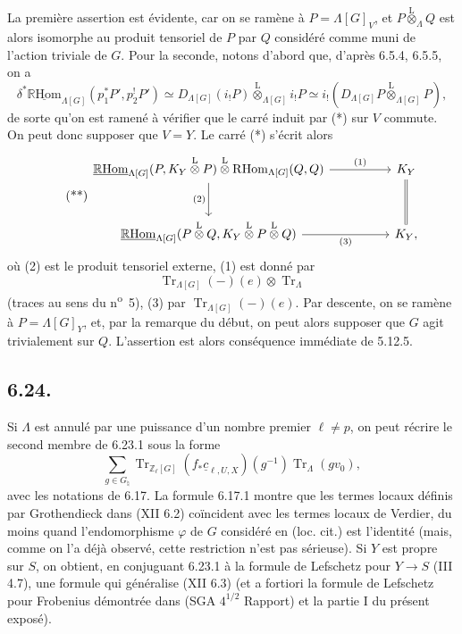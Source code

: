\documentclass[11pt]{article}
\newcommand{\R}{\mathbb{R}}\newcommand{\RHomCore}{\mathbb{R}\mathrm{Hom}}
\providecommand{\RHom}{\RHomCore}
\providecommand{\uRHom}{\underline{\RHom}}
\providecommand{\Tr}{\operatorname{Tr}}
\providecommand{\Tr}{\operatorname{Tr}}
\providecommand{\lten}{\overset{\mathrm L}{\otimes}}
\providecommand{\Tr}{\operatorname{Tr}}
\providecommand{\RHom}{\RHomCore}
\providecommand{\lten}{\overset{\mathrm L}{\otimes}}
\providecommand{\RHom}{\R\mathcal{H}om}
\providecommand{\lten}{\overset{\mathrm L}{\otimes}}
\providecommand{\R}{\mathrm R}
\providecommand{\Tr}{\operatorname{Tr}}
\providecommand{\lten}{\overset{\mathrm L}{\otimes}}
\providecommand{\lten}{\overset{\mathrm L}{\otimes}}
\providecommand{\lten}{\overset{\mathrm L}{\otimes}}
\providecommand{\RHom}{\RHomCore}
\providecommand{\Tr}{\operatorname{Tr}}
\providecommand{\lten}{\overset{\mathrm L}{\otimes}}
\begin{document}
La première assertion est évidente, car on se ramène à $P=\Lambda[G]_V$, et $P\lten_{\Lambda}Q$ est alors isomorphe au produit tensoriel de $P$ par $Q$ considéré comme muni de l'action triviale de $G$. Pour la seconde, notons d'abord que, d'après 6.5.4, 6.5.5, on a
\[
\delta^*\uRHom_{\Lambda[G]}(p_1^*P',p_2^!P')
\simeq
D_{\Lambda[G]}(i_!P)\lten_{\Lambda[G]} i_!P
\simeq
i_!(D_{\Lambda[G]}P\lten_{\Lambda[G]}P),
\]
de sorte qu'on est ramené à vérifier que le carré induit par (*) sur $V$ commute. On peut donc supposer que $V=Y$. Le carré (*) s'écrit alors
\begin{equation}
\tag{**}
\begin{tikzcd}[column sep=huge,row sep=large]
\uRHom_{\Lambda[G]}(P,K_Y\lten P)\lten\mathrm{R}\mathrm{Hom}_{\Lambda[G]}(Q,Q)
  \arrow[r,"(1)"] \arrow[d,"(2)"']
& K_Y \arrow[d,
equal]\\
\uRHom_{\Lambda[G]}(P\lten Q,K_Y\lten P\lten Q) \arrow[r,"(3)"']
& K_Y ,
\end{tikzcd}
\end{equation}
où (2) est le produit tensoriel externe, (1) est donné par
\[
\Tr_{\Lambda[G]}(-)(e)\otimes\Tr_{\Lambda}
\]
(traces au sens du n\textsuperscript{o}~5), (3) par $\Tr_{\Lambda[G]}(-)(e)$. Par descente, on se ramène à $P=\Lambda[G]_Y$, et, par la remarque du début, on peut alors supposer que $G$ agit trivialement sur $Q$. L'assertion est alors conséquence immédiate de 5.12.5.

\subsection*{6.24.}
Si $\Lambda$ est annulé par une puissance d'un nombre premier $\ell\ne p$, on peut récrire le second membre de 6.23.1 sous la forme
\[
\sum_{g\in G_{\natural}}
\Tr_{\mathbb Z_{\ell}[G]}(f_*\underline c_{\ell,U,X})(g^{-1})
\Tr_{\Lambda}(gv_0),
\]
avec les notations de 6.17. La formule 6.17.1 montre que les termes locaux définis par Grothendieck dans (XII 6.2) coïncident avec les termes locaux de Verdier, du moins quand l'endomorphisme $\varphi$ de $G$ considéré en (loc. cit.) est l'identité (mais, comme on l'a déjà observé, cette restriction n'est pas sérieuse). Si $Y$ est propre sur $S$, on obtient, en conjuguant 6.23.1 à la formule de Lefschetz pour $Y\to S$ (III 4.7), une formule qui généralise (XII 6.3) (et a fortiori la formule de Lefschetz pour Frobenius démontrée dans (SGA $4^{1/2}$ Rapport) et la partie I du présent exposé).
\end{document}
